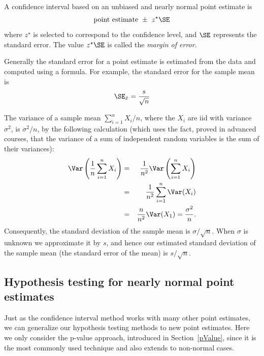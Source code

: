\begin{termBox}{\label{generalConfidenceIntervalTermBox}%
A confidence interval based on an unbiased and nearly normal point estimate is
\begin{eqnarray}
\text{point estimate}\ \pm\ z^{\star}\SE
\label{95PercGeneralCIInGeneralizingSection}
\end{eqnarray}
where $z^{\star}$ is selected to correspond to the confidence level, and $\SE$ represents the standard error. The value $z^{\star}\SE$ is called the \emph{margin of error}.}
\end{termBox}

Generally the standard error for a point estimate is estimated from the data and computed using a formula. For example, the standard error for the sample mean is
\begin{eqnarray*}
\SE_{\bar{x}} = \frac{s}{\sqrt{n}}
\end{eqnarray*}

The variance of a sample mean $\sum_{i=1}^n X_i/n$, where the $X_i$ are iid with variance $\sigma^2$, is $\sigma^2/n$, by the following calculation (which uses the fact, proved in advanced courses, that the variance of a sum of independent random variables is the sum of their variances):
\begin{eqnarray*}
	\Var\left(\frac1n\sum_{i=1}^n X_i\right) &=& \frac1{n^2}\Var\left(\sum_{i=1}^n X_i\right)\\
	 &=& \frac1{n^2}\sum_{i=1}^n\Var(X_i)\\
	 &=& \frac{n}{n^2}\Var(X_1) = \frac{\sigma^2}n.
\end{eqnarray*}
Consequently, the standard deviation of the sample mean is $\sigma/\sqrt{n}$. When $\sigma$ is unknown we approximate it by $s$, and hence our estimated standard deviation of the sample mean (the standard error of the mean) is $s/\sqrt{n}$.



\subsection{Hypothesis testing for nearly normal point estimates}

Just as the confidence interval method works with many other point estimates, we can generalize our hypothesis testing methods to new point estimates. Here we only consider the p-value approach, introduced in Section~\ref{pValue}, since it is the most commonly used technique and also extends to non-normal cases.

